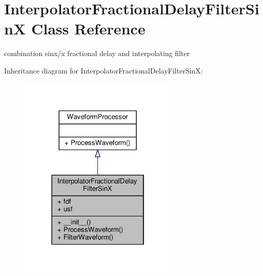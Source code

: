 \hypertarget{classSignalIntegrity_1_1TimeDomain_1_1Filters_1_1InterpolatorSinX_1_1InterpolatorFractionalDelayFilterSinX}{}\section{Interpolator\+Fractional\+Delay\+Filter\+SinX Class Reference}
\label{classSignalIntegrity_1_1TimeDomain_1_1Filters_1_1InterpolatorSinX_1_1InterpolatorFractionalDelayFilterSinX}


combination sinx/x fractional delay and interpolating filter  




Inheritance diagram for Interpolator\+Fractional\+Delay\+Filter\+SinX\+:\nopagebreak
\begin{figure}[H]
\begin{center}
\leavevmode
\includegraphics[width=214pt]{classSignalIntegrity_1_1TimeDomain_1_1Filters_1_1InterpolatorSinX_1_1InterpolatorFractionalDelayFilterSinX__inherit__graph}
\end{center}
\end{figure}


